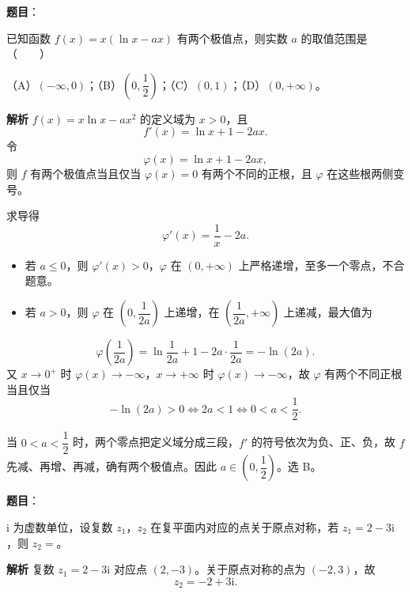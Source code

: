 \begin{answer}

\textbf{题目}：

已知函数 $f(x)=x(\ln x-ax)$ 有两个极值点，则实数 $a$ 的取值范围是\mbox{（　　）}

（A）$(-\infty,0)$；（B）$\left(0,\dfrac12\right)$；（C）$(0,1)$；（D）$(0,+\infty)$。

\textbf{解析}
$f(x)=x\ln x-ax^2$ 的定义域为 $x>0$，且
\nopagebreak[4]
\[f'(x)=\ln x+1-2ax.\]
令
\nopagebreak[4]
\[\varphi(x)=\ln x+1-2ax,\]
则 $f$ 有两个极值点当且仅当 $\varphi(x)=0$ 有两个不同的正根，且 $\varphi$ 在这些根两侧变号。

求导得
\nopagebreak[4]
\[\varphi'(x)=\frac1x-2a.\]

\begin{itemize}
\item 若 $a\leqslant0$，则 $\varphi'(x)>0$，$\varphi$ 在 $(0,+\infty)$ 上严格递增，至多一个零点，不合题意。
\item 若 $a>0$，则 $\varphi$ 在 $\left(0,\dfrac1{2a}\right)$ 上递增，在 $\left(\dfrac1{2a},+\infty\right)$ 上递减，最大值为
\end{itemize}
\nopagebreak[4]
\[\varphi\left(\frac1{2a}\right)=\ln\frac1{2a}+1-2a\cdot\frac1{2a}=-\ln(2a).\]
又 $x\to0^+$ 时 $\varphi(x)\to-\infty$，$x\to+\infty$ 时 $\varphi(x)\to-\infty$，故 $\varphi$ 有两个不同正根当且仅当
\nopagebreak[4]
\[-\ln(2a)>0\iff 2a<1\iff 0<a<\frac12.\]

当 $0<a<\dfrac12$ 时，两个零点把定义域分成三段，$f'$ 的符号依次为负、正、负，故 $f$ 先减、再增、再减，确有两个极值点。因此 $a\in\left(0,\dfrac12\right)$。选 B。


\end{answer}
\begin{answer}

\textbf{题目}：

$\mathrm i$ 为虚数单位，设复数 $z_1$，$z_2$ 在复平面内对应的点关于原点对称，若 $z_1=2-3\mathrm i$，则 $z_2=$\gkblank{}。

\textbf{解析}
复数 $z_1=2-3\mathrm i$ 对应点 $(2,-3)$。关于原点对称的点为 $(-2,3)$，故
\nopagebreak[4]
\[z_2=-2+3\mathrm i.\]


\end{answer}
